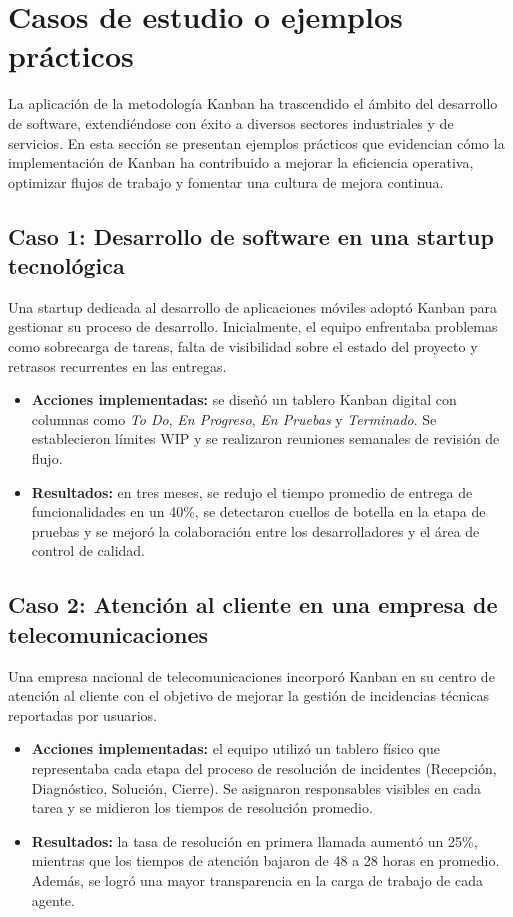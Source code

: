 \section{Casos de estudio o ejemplos prácticos}

La aplicación de la metodología Kanban ha trascendido el ámbito del desarrollo de software, extendiéndose con éxito a diversos sectores industriales y de servicios. En esta sección se presentan ejemplos prácticos que evidencian cómo la implementación de Kanban ha contribuido a mejorar la eficiencia operativa, optimizar flujos de trabajo y fomentar una cultura de mejora continua.

\subsection{Caso 1: Desarrollo de software en una startup tecnológica}

Una startup dedicada al desarrollo de aplicaciones móviles adoptó Kanban para gestionar su proceso de desarrollo. Inicialmente, el equipo enfrentaba problemas como sobrecarga de tareas, falta de visibilidad sobre el estado del proyecto y retrasos recurrentes en las entregas.

\begin{itemize}
    \item \textbf{Acciones implementadas:} se diseñó un tablero Kanban digital con columnas como \textit{To Do}, \textit{En Progreso}, \textit{En Pruebas} y \textit{Terminado}. Se establecieron límites WIP y se realizaron reuniones semanales de revisión de flujo.
    \item \textbf{Resultados:} en tres meses, se redujo el tiempo promedio de entrega de funcionalidades en un 40\%, se detectaron cuellos de botella en la etapa de pruebas y se mejoró la colaboración entre los desarrolladores y el área de control de calidad.
\end{itemize}

\subsection{Caso 2: Atención al cliente en una empresa de telecomunicaciones}

Una empresa nacional de telecomunicaciones incorporó Kanban en su centro de atención al cliente con el objetivo de mejorar la gestión de incidencias técnicas reportadas por usuarios.

\begin{itemize}
    \item \textbf{Acciones implementadas:} el equipo utilizó un tablero físico que representaba cada etapa del proceso de resolución de incidentes (Recepción, Diagnóstico, Solución, Cierre). Se asignaron responsables visibles en cada tarea y se midieron los tiempos de resolución promedio.
    \item \textbf{Resultados:} la tasa de resolución en primera llamada aumentó un 25\%, mientras que los tiempos de atención bajaron de 48 a 28 horas en promedio. Además, se logró una mayor transparencia en la carga de trabajo de cada agente.
\end{itemize}

